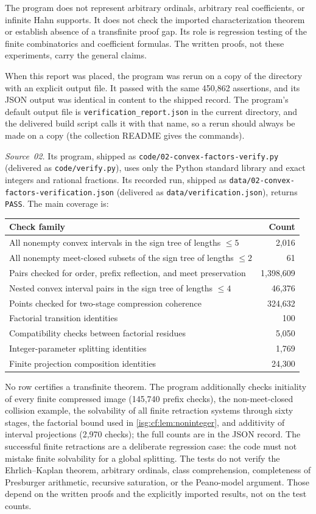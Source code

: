 \documentclass[11pt]{article}
\theoremstyle{definition}
\theoremstyle{remark}
\newcommand{\fn}[1]{\nolinkurl{#1}}
\begin{document}
The program does not represent arbitrary ordinals, arbitrary real
coefficients, or infinite Hahn supports. It does not check the imported
characterization theorem or establish absence of a transfinite proof gap.
Its role is regression testing of the finite combinatorics and coefficient
formulas. The written proofs, not these experiments, carry the general
claims.

When this report was placed, the program was rerun on a copy of the
directory with an explicit output file. It passed with the same 450,862
assertions, and its JSON output was identical in content to the shipped
record. The program's default output file is
\fn{verification_report.json} in the current directory, and the
delivered build script calls it with that name, so a rerun should always
be made on a copy (the collection README gives the commands).

\emph{Source~02.} Its program, shipped as
\fn{code/02-convex-factors-verify.py} (delivered as
\fn{code/verify.py}), uses only the Python standard library and exact
integers and rational fractions. Its recorded run, shipped as
\fn{data/02-convex-factors-verification.json} (delivered as
\fn{data/verification.json}), returns \texttt{PASS}. The main coverage
is:
\begin{center}\small
\begin{tabular}{@{}p{}r@{}}
\toprule
Check family & Count\\
\midrule
All nonempty convex intervals in the sign tree of lengths $\le5$ & 2,016\\
All nonempty meet-closed subsets of the sign tree of lengths $\le2$ & 61\\
Pairs checked for order, prefix reflection, and meet preservation & 1,398,609\\
Nested convex interval pairs in the sign tree of lengths $\le4$ & 46,376\\
Points checked for two-stage compression coherence & 324,632\\
Factorial transition identities & 100\\
Compatibility checks between factorial residues & 5,050\\
Integer-parameter splitting identities & 1,769\\
Finite projection composition identities & 24,300\\
\bottomrule
\end{tabular}
\end{center}
No row certifies a transfinite theorem. The program additionally checks
initiality of every finite compressed image (145,740 prefix checks), the
non-meet-closed collision example, the solvability of all finite
retraction systems through sixty stages, the factorial bound used in
\cref{isg:cf:lem:noninteger}, and additivity of interval projections
(2,970 checks); the full counts are in the JSON record. The successful
finite retractions are a deliberate regression case: the code must not
mistake finite solvability for a global splitting. The tests do not
verify the Ehrlich--Kaplan theorem, arbitrary ordinals, class
comprehension, completeness of Presburger arithmetic, recursive
saturation, or the Peano-model argument. Those depend on the written
proofs and the explicitly imported results, not on the test counts.
\end{document}
